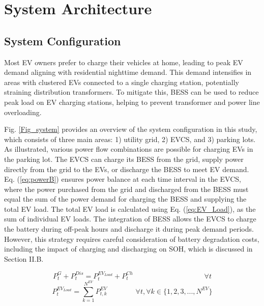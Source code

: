 \documentclass[10pt, journal]{IEEEtran}
\begin{document}
\vspace{-4mm}
\section{System Architecture}
\vspace{-1mm}
\subsection{System Configuration}
Most EV owners prefer to charge their vehicles at home, leading to peak EV demand aligning with residential nighttime demand. This demand intensifies in areas with clustered EVs connected to a single charging station, potentially straining distribution transformers. To mitigate this, BESS can be used to reduce peak load on EV charging stations, helping to prevent transformer and power line overloading.

Fig. \ref{Fig_system} provides an overview of the system configuration in this study, which consists of three main areas: 1) utility grid, 2) EVCS, and 3) parking lots. As illustrated, various power flow combinations are possible for charging EVs in the parking lot. The EVCS can charge its BESS from the grid, supply power directly from the grid to the EVs, or discharge the BESS to meet EV demand. Eq. (\ref{eq:powerB}) ensures power balance at each time interval in the EVCS, where the power purchased from the grid and discharged from the BESS must equal the sum of the power demand for charging the BESS and supplying the total EV load. The total EV load is calculated using Eq. (\ref{eq:EV_Load}), as the sum of individual EV loads. The integration of BESS allows the EVCS to charge the battery during off-peak hours and discharge it during peak demand periods. However, this strategy requires careful consideration of battery degradation costs, including the impact of charging and discharging on SOH, which is discussed in Section II.B.

\vspace{-3mm}
{\small
\begin{equation}
\label{eq:powerB}
    P_t^{G} + P_t^{Dis} = P_t^{EV_{Load}} + P_t^{Ch} \quad \quad \quad \quad \quad \quad \quad \quad \quad \quad \forall t 
\end{equation}
\begin{equation}
\label{eq:EV_Load}
    P_t^{EV_{Load}} = \sum_{k=1}^{N^{EV}} P_{t,k}^{EV} \quad \quad \quad \quad \forall t , \forall k \in \{1,2,3, ..., N^{EV}\}
\end{equation}}
\end{document}

